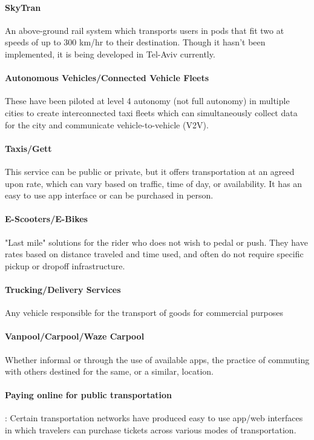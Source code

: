 \documentclass[12pt]{article}                         %
\begin{document}
\paragraph{SkyTran} An above-ground rail system which transports users in pods that fit two at speeds of up to 300 km/hr to their destination. Though it hasn’t been implemented, it is being developed in Tel-Aviv currently.

\paragraph{Autonomous Vehicles/Connected Vehicle Fleets} These have been piloted at level 4 autonomy (not full autonomy) in multiple cities to create interconnected taxi fleets which can simultaneously collect data for the city and communicate vehicle-to-vehicle (V2V).

\paragraph{Taxis/Gett} This service can be public or private, but it offers transportation at an agreed upon rate, which can vary based on traffic, time of day, or availability. It has an easy to use app interface or can be purchased in person. 

\paragraph{E-Scooters/E-Bikes} "Last mile" solutions for the rider who does not wish to pedal or push. They have rates based on distance traveled and time used, and often do not require specific pickup or dropoff infrastructure.

\paragraph{Trucking/Delivery Services} Any vehicle responsible for the transport of goods for commercial purposes

\paragraph{Vanpool/Carpool/Waze Carpool} Whether informal or through the use of available apps, the practice of commuting with others destined for the same, or a similar, location.

\paragraph{Paying online for public transportation}: Certain transportation networks have produced easy to use app/web interfaces in which travelers can purchase tickets across various modes of transportation.
\end{document}
